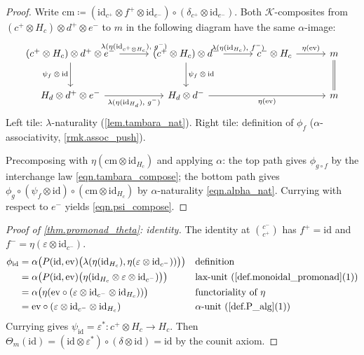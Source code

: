 \documentclass[11pt]{article}
\theoremstyle{definition}
\newcommand{\id}{\mathrm{id}}
\newcommand{\outp}[1]{#1^{+}}
\newcommand{\inpt}[1]{#1^{-}}
\newcommand{\lensob}[1]{\binom{\inpt{#1}}{\outp{#1}}}
\newcommand{\cat}[1]{\mathcal{#1}}
\newcommand{\ev}{\mathrm{ev}}
\begin{document}
\begin{proof}
Write $\mathrm{cm}\coloneqq(\id_{\outp{c}}\otimes\outp{f}\otimes\id_{\inpt{e}})\circ(\delta_{\outp{c}}\otimes\id_{\inpt{e}})$. Both $\cat{K}$-composites from $(\outp{c}\otimes H_c)\otimes\outp{d}\otimes\inpt{e}$ to $m$ in the following diagram have the same $\alpha$-image:
\[
\begin{tikzcd}[column sep=3em, row sep=2.5em, every label/.append style={font=\scriptsize}, ampersand replacement=\&]
(\outp{c}\otimes H_c)\otimes\outp{d}\otimes\inpt{e}
  \ar[r, "{\lambda(\eta(\id_{\outp{c}\otimes H_c}),\,\inpt{g})}"]
  \ar[d, "{\psi_f\otimes\id}"']
\& (\outp{c}\otimes H_c)\otimes\inpt{d}
  \ar[r, "{\lambda(\eta(\id_{H_c}),\,\inpt{f})}"]
  \ar[d, "{\psi_f\otimes\id}"]
\& \inpt{c}\otimes H_c
  \ar[r, "{\eta(\ev)}"]
\& m
  \ar[d, equal]
\\
H_d\otimes\outp{d}\otimes\inpt{e}
  \ar[r, "{\lambda(\eta(\id_{H_d}),\,\inpt{g})}"']
\& H_d\otimes\inpt{d}
  \ar[rr, "{\eta(\ev)}"']
\&\& m
\end{tikzcd}
\]
Left tile: $\lambda$-naturality (\cref{lem.tambara_nat}). Right tile: definition of $\phi_f$ ($\alpha$-associativity, \cref{rmk.assoc_push}).

Precomposing with $\eta(\mathrm{cm}\otimes\id_{H_c})$ and applying $\alpha$: the top path gives $\phi_{g\circ f}$ by the interchange law \eqref{eqn.tambara_compose}; the bottom path gives $\phi_g\circ(\psi_f\otimes\id)\circ(\mathrm{cm}\otimes\id_{H_c})$ by $\alpha$-naturality \eqref{eqn.alpha_nat}. Currying with respect to $\inpt{e}$ yields \eqref{eqn.psi_compose}.
\end{proof}

\begin{proof}[Proof of \cref{thm.promonad_theta}: identity]
The identity at $\lensob{c}$ has $\outp{f}=\id$ and $\inpt{f}=\eta(\varepsilon\otimes\id_{\inpt{c}})$.
\begin{align}
\phi_{\id}
&=\alpha\bigl(P(\id,\ev)\bigl(\lambda(\eta(\id_{H_c}),\eta(\varepsilon\otimes\id_{\inpt{c}}))\bigr)\bigr)
&&\text{definition}\\
&=\alpha\bigl(P(\id,\ev)\bigl(\eta(\id_{H_c}\otimes\varepsilon\otimes\id_{\inpt{c}})\bigr)\bigr)
&&\text{lax-unit (\cref{def.monoidal_promonad}(1))}\\
&=\alpha\bigl(\eta(\ev\circ(\varepsilon\otimes\id_{\inpt{c}}\otimes\id_{H_c}))\bigr)
&&\text{functoriality of }\eta\\
&=\ev\circ(\varepsilon\otimes\id_{\inpt{c}}\otimes\id_{H_c})
&&\alpha\text{-unit (\cref{def.P_alg}(1))}
\end{align}
Currying gives $\psi_{\id}=\varepsilon^*\colon\outp{c}\otimes H_c\to H_c$. Then $\Theta_m(\id)=(\id\otimes\varepsilon^*)\circ(\delta\otimes\id)=\id$ by the counit axiom.
\end{proof}
\end{document}
